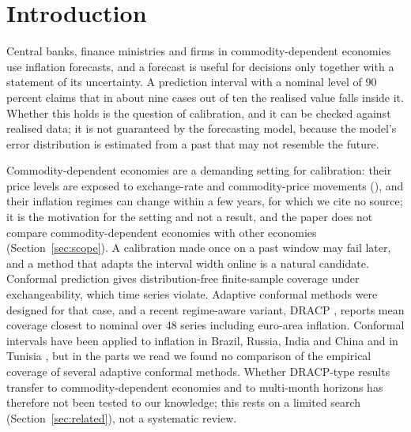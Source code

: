 \section{Introduction}\label{sec:intro}

Central banks, finance ministries and firms in commodity-dependent economies use inflation forecasts, and a forecast is useful for decisions only together with a statement of its uncertainty. A prediction interval with a nominal level of 90 percent claims that in about nine cases out of ten the realised value falls inside it. Whether this holds is the question of calibration, and it can be checked against realised data; it is not guaranteed by the forecasting model, because the model's error distribution is estimated from a past that may not resemble the future.

Commodity-dependent economies are a demanding setting for calibration: their price levels are exposed to exchange-rate and commodity-price movements (\citealp{gelos2017commodity}), and their inflation regimes can change within a few years, for which we cite no source; it is the motivation for the setting and not a result, and the paper does not compare commodity-dependent economies with other economies (Section~\ref{sec:scope}). A calibration made once on a past window may fail later, and a method that adapts the interval width online is a natural candidate. Conformal prediction \citep{vovk2005algorithmic} gives distribution-free finite-sample coverage under exchangeability, which time series violate. Adaptive conformal methods \citep{gibbs2021aci,gibbs2024faci,angelopoulos2023pid,bhatnagar2023saocp} were designed for that case, and a recent regime-aware variant, DRACP \citep{oancea2026dracp}, reports mean coverage closest to nominal over 48 series including euro-area inflation. Conformal intervals have been applied to inflation in Brazil, Russia, India and China \citep{sengupta2025fewnet} and in Tunisia \citep{brahem2026tunisia}, but in the parts we read we found no comparison of the empirical coverage of several adaptive conformal methods. Whether DRACP-type results transfer to commodity-dependent economies and to multi-month horizons has therefore not been tested to our knowledge; this rests on a limited search (Section~\ref{sec:related}), not a systematic review.

